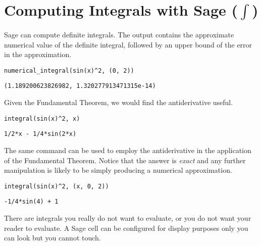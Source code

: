 \documentclass[10pt,]{article}
\newcommand{\alert}[1]{\textbf{\textit{#1}}}
\theoremstyle{plain}
\theoremstyle{definition}
\theoremstyle{definition}
\theoremstyle{definition}
\theoremstyle{definition}
\theoremstyle{definition}
\theoremstyle{definition}
\numberwithin{equation}{section}
\begin{document}
\section[{Computing Integrals with Sage (\(\int\))}]{Computing Integrals with Sage (\(\int\))}\label{section-sage-cells}
\index{units!A@Z (\alert{sort as} A)}\index{units!Z@A (\alert{sort as} Z)}\hypertarget{p-12}{}%
Sage can compute definite integrals.  The output contains the approximate numerical value of the definite integral, followed by an upper bound  of the error in the approximation.%
\begin{lstlisting}[style=sageinput]
numerical_integral(sin(x)^2, (0, 2))
\end{lstlisting}
\begin{lstlisting}[style=sageoutput]
(1.189200623826982, 1.320277913471315e-14)
\end{lstlisting}
\hypertarget{p-13}{}%
Given the Fundamental Theorem, we would find the antiderivative useful.%
\begin{lstlisting}[style=sageinput]
integral(sin(x)^2, x)
\end{lstlisting}
\begin{lstlisting}[style=sageoutput]
1/2*x - 1/4*sin(2*x)
\end{lstlisting}
\hypertarget{p-14}{}%
The same command can be used to employ the antiderivative in the application of the Fundamental Theorem.  Notice that the answer is \emph{exact} and any further manipulation is likely to be simply producing a numerical approximation.%
\begin{lstlisting}[style=sageinput]
integral(sin(x)^2, (x, 0, 2))
\end{lstlisting}
\begin{lstlisting}[style=sageoutput]
-1/4*sin(4) + 1
\end{lstlisting}
\hypertarget{p-15}{}%
There are integrals you really do not want to evaluate, or you do not want your reader to evaluate.  A Sage cell can be configured for display purposes only \textemdash{} you can look but you cannot touch.%
\end{document}
